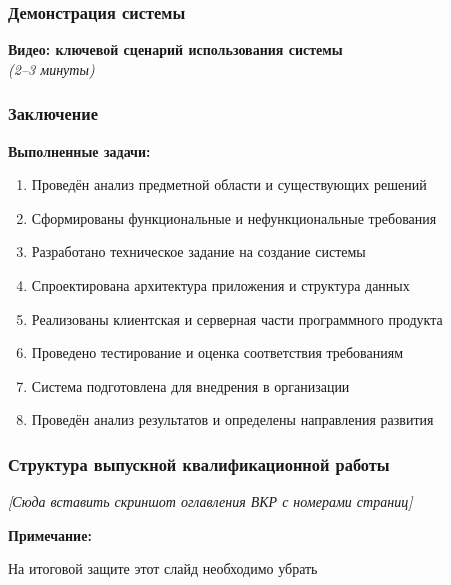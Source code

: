 \documentclass{beamer}
\begin{document}
\begin{frame}
    \frametitle{Демонстрация системы}
    
    \centering
    \large \textbf{Видео: ключевой сценарий использования системы} \\[0.5em]
    \small \textit{(2–3 минуты)} \\[1em]
    
\end{frame}

\begin{frame}
    \frametitle{Заключение}
    
    \textbf{Выполненные задачи:}
    \begin{enumerate}
        \item Проведён анализ предметной области и существующих решений
        \item Сформированы функциональные и нефункциональные требования
        \item Разработано техническое задание на создание системы
        \item Спроектирована архитектура приложения и структура данных
        \item Реализованы клиентская и серверная части программного продукта
        \item Проведено тестирование и оценка соответствия требованиям
        \item Система подготовлена для внедрения в организации
        \item Проведён анализ результатов и определены направления развития
    \end{enumerate}
\end{frame}

\begin{frame}
    \frametitle{Структура выпускной квалификационной работы}
    
    \centering
    \large
    \textit{[Сюда вставить скриншот оглавления ВКР с номерами страниц]}
    
    \vspace{0.5cm}
    \small
    \textbf{Примечание:}
    
    На итоговой защите этот слайд необходимо убрать
\end{frame}
\end{document}
